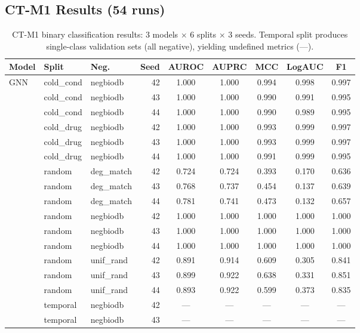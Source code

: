 \subsection{CT-M1 Results (54 runs)}

\begin{table}[h]
\centering
\caption{CT-M1 binary classification results: 3 models $\times$ 6 splits $\times$ 3 seeds. Temporal split produces single-class validation sets (all negative), yielding undefined metrics (---).}
\label{tab:ct_m1_full}
\scriptsize
\begin{tabular}{@{}lllrccccc@{}}
\toprule
\textbf{Model} & \textbf{Split} & \textbf{Neg.} & \textbf{Seed} & \textbf{AUROC} & \textbf{AUPRC} & \textbf{MCC} & \textbf{LogAUC} & \textbf{F1} \\
\midrule
\multirow{18}{*}{GNN}
& cold\_cond & negbiodb & 42 & 1.000 & 1.000 & 0.994 & 0.998 & 0.997 \\
& cold\_cond & negbiodb & 43 & 1.000 & 1.000 & 0.990 & 0.991 & 0.995 \\
& cold\_cond & negbiodb & 44 & 1.000 & 1.000 & 0.990 & 0.989 & 0.995 \\
& cold\_drug & negbiodb & 42 & 1.000 & 1.000 & 0.993 & 0.999 & 0.997 \\
& cold\_drug & negbiodb & 43 & 1.000 & 1.000 & 0.993 & 0.999 & 0.997 \\
& cold\_drug & negbiodb & 44 & 1.000 & 1.000 & 0.991 & 0.999 & 0.995 \\
& random & deg\_match & 42 & 0.724 & 0.724 & 0.393 & 0.170 & 0.636 \\
& random & deg\_match & 43 & 0.768 & 0.737 & 0.454 & 0.137 & 0.639 \\
& random & deg\_match & 44 & 0.781 & 0.741 & 0.473 & 0.132 & 0.657 \\
& random & negbiodb & 42 & 1.000 & 1.000 & 1.000 & 1.000 & 1.000 \\
& random & negbiodb & 43 & 1.000 & 1.000 & 1.000 & 1.000 & 1.000 \\
& random & negbiodb & 44 & 1.000 & 1.000 & 1.000 & 1.000 & 1.000 \\
& random & unif\_rand & 42 & 0.891 & 0.914 & 0.609 & 0.305 & 0.841 \\
& random & unif\_rand & 43 & 0.899 & 0.922 & 0.638 & 0.331 & 0.851 \\
& random & unif\_rand & 44 & 0.893 & 0.922 & 0.599 & 0.373 & 0.835 \\
& temporal & negbiodb & 42 & --- & --- & --- & --- & --- \\
& temporal & negbiodb & 43 & --- & --- & --- & --- & --- \\

\end{tabular}
\end{table}
